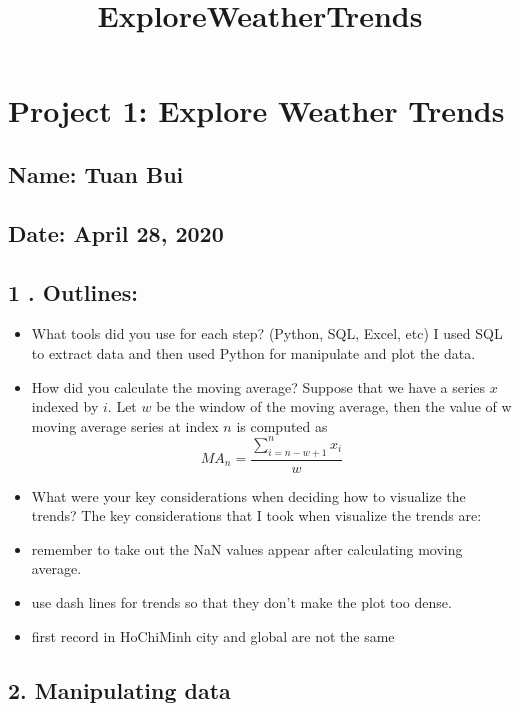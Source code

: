 \documentclass[11pt]{article}
\title{ExploreWeatherTrends}
\begin{document}
    
    
    \maketitle
    
    

    
    \section{Project 1: Explore Weather
Trends}\label{project-1-explore-weather-trends}

\subsection{Name: Tuan Bui}\label{name-tuan-bui}

\subsection{Date: April 28, 2020}\label{date-april-28-2020}

    \subsection{1 . Outlines:}\label{outlines}

\begin{itemize}
\item
  What tools did you use for each step? (Python, SQL, Excel, etc) I used
  SQL to extract data and then used Python for manipulate and plot the
  data.
\item
  How did you calculate the moving average? Suppose that we have a
  series \(x\) indexed by \(i\). Let \(w\) be the window of the moving
  average, then the value of w moving average series at index \(n\) is
  computed as \[MA_n = \frac{\sum_{i=n-w+1}^n x_i}{w}\]
\item
  What were your key considerations when deciding how to visualize the
  trends? The key considerations that I took when visualize the trends
  are:
\item
  remember to take out the NaN values appear after calculating moving
  average.
\item
  use dash lines for trends so that they don't make the plot too dense.
\item
  first record in HoChiMinh city and global are not the same
\end{itemize}

    \subsection{2. Manipulating data}\label{manipulating-data}
\end{document}
